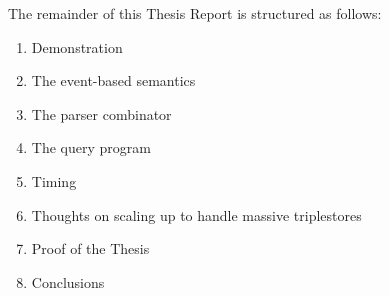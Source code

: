 \documentclass[../main.tex]{subfiles}
\begin{document}
The remainder of this Thesis Report is structured as follows:

\begin{enumerate}
	\item Demonstration
	\item The event-based semantics
	\item The parser combinator
	\item The query program
	\item Timing
	\item Thoughts on scaling up to handle massive triplestores
	\item Proof of the Thesis
	\item Conclusions
\end{enumerate}
\end{document}
